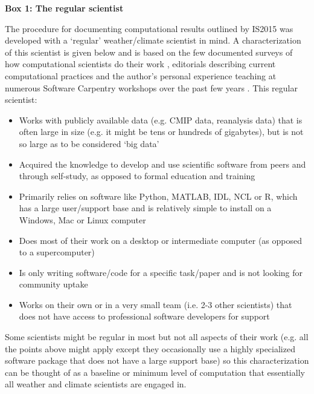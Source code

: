 \textbf{Box 1: The regular scientist}

The procedure for documenting computational results outlined by IS2015 was developed with a `regular' weather/climate scientist in mind. A characterization of this scientist is given below and is based on the few documented surveys of how computational scientists do their work \citep{Hannay2009,Stodden2010,Momcheva2015}, editorials describing current computational practices \citep[e.g.][]{Easterbrook2014} and the author's personal experience teaching at numerous Software Carpentry workshops over the past few years \citep{Wilson2014}. This regular scientist:
\begin{itemize}
\item Works with publicly available data (e.g. CMIP data, reanalysis data) that is often large in size (e.g. it might be tens or hundreds of gigabytes), but is not so large as to be considered `big data' 
\item Acquired the knowledge to develop and use scientific software from peers and through self-study, as opposed to formal education and training
\item Primarily relies on software like Python, MATLAB, IDL, NCL or R, which has a large user/support base and is relatively simple to install on a Windows, Mac or Linux computer
\item Does most of their work on a desktop or intermediate computer (as opposed to a supercomputer)
\item Is only writing software/code for a specific task/paper and is not looking for community uptake  
\item Works on their own or in a very small team (i.e. 2-3 other scientists) that does not have access to professional software developers for support
\end{itemize}

Some scientists might be regular in most but not all aspects of their work (e.g. all the points above might apply except they occasionally use a highly specialized software package that does not have a large support base) so this characterization can be thought of as a baseline or minimum level of computation that essentially all weather and climate scientists are engaged in.  

  
  
  
  
  
  